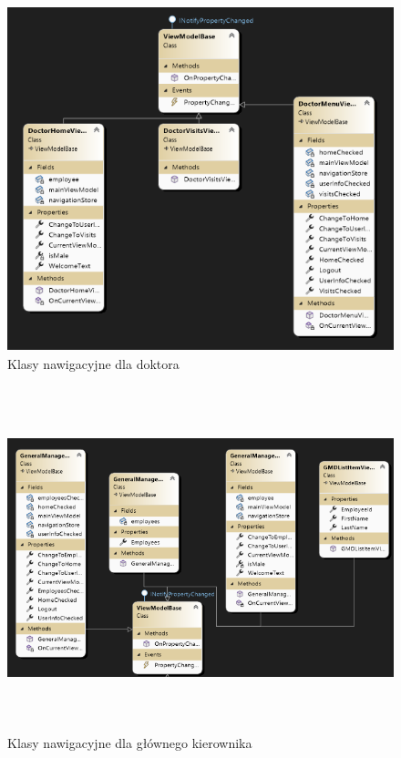 \begin{figure}[H]
\begin{center}
    \includegraphics[height=10cm]{images/diag_kl_nav_dok.png}
    \caption{Klasy nawigacyjne dla doktora}
\end{center}
\end{figure}

\begin{figure}[H]
\begin{center}
    \includegraphics[height=10cm]{images/diag_kl_nav_gen_man.png}
    \caption{Klasy nawigacyjne dla głównego kierownika}
\end{center}
\end{figure}

